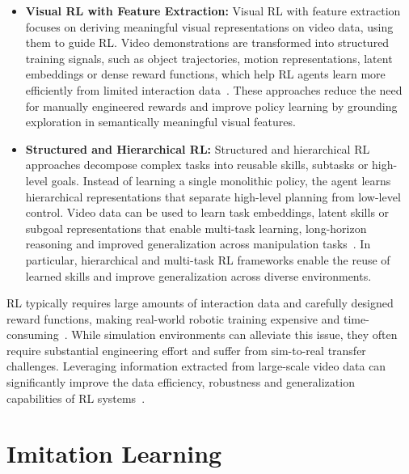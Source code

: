 \begin{itemize}
    \item \textbf{Visual RL with Feature Extraction:}
    Visual RL with feature extraction focuses on deriving meaningful visual representations on video data, using them to guide \ac{RL}. Video demonstrations are transformed into structured training signals, such as object trajectories, motion representations, latent embeddings or dense reward functions, which help RL agents learn more efficiently from limited interaction data~\cite{Schmeckpeper2020ReinforcementLW, Petrik2020LearningOM, Zorina2021LearningTM}. These approaches reduce the need for manually engineered rewards and improve policy learning by grounding exploration in semantically meaningful visual features.

    \item \textbf{Structured and Hierarchical RL:} 
    Structured and hierarchical RL approaches decompose complex tasks into reusable skills, subtasks or high-level goals. Instead of learning a single monolithic policy, the agent learns hierarchical representations that separate high-level planning from low-level control. Video data can be used to learn task embeddings, latent skills or subgoal representations that enable multi-task learning, long-horizon reasoning and improved generalization across manipulation tasks~\cite{Xu2017NeuralTP, Mees2019AdversarialSN, ChaneSane2023LearningVP}.
    In particular, hierarchical and multi-task RL frameworks enable the reuse of learned skills and improve generalization across diverse environments.
\end{itemize}

\ac{RL} typically requires large amounts of interaction data and carefully designed reward functions, making real-world robotic training expensive and time-consuming~\cite{Eze2024LearningBW}. While simulation environments can alleviate this issue, they often require substantial engineering effort and suffer from sim-to-real transfer challenges. Leveraging information extracted from large-scale video data can significantly improve the data efficiency, robustness and generalization capabilities of \ac{RL} systems~\cite{McCarthy_2025}.


\section{Imitation Learning}


